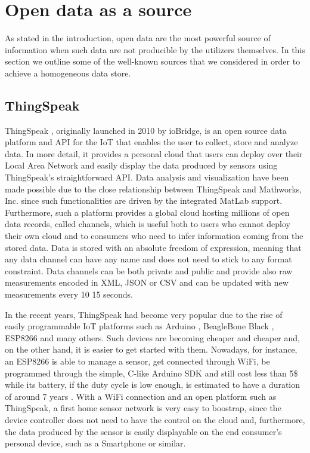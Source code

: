 \section{Open data as a source}
\label{sec:open}

As stated in the introduction, open data are the most powerful source of information when such data are not producible by the utilizers themselves.
In this section we outline some of the well-known sources that we considered in order to achieve a homogeneous data store.

\subsection{ThingSpeak}
ThingSpeak \cite{thingspeak}, originally launched in 2010 by ioBridge, is an open source data platform and API for the IoT that enables the user to collect, store and analyze data.
In more detail, it provides a personal cloud that users can deploy over their Local Area Network and easily display the data produced by sensors using ThingSpeak's straightforward API.
Data analysis and visualization have been made possible due to the close relationship between ThingSpeak and Mathworks, Inc. since such functionalities are driven by the integrated MatLab support. 
Furthermore, such a platform provides a global cloud hosting millions of open data records, called channels, which is useful both to users who cannot deploy their own cloud and to consumers who need to infer information coming from the stored data.
Data is stored with an absolute freedom of expression, meaning that any data channel can have any name and does not need to stick to any format constraint.
Data channels can be both private and public and provide also raw measurements encoded in XML, JSON or CSV and can be updated with new measurements every \color{red}10\color{black} 15 seconds.

In the recent years, ThingSpeak had become very popular due to the rise of easily programmable IoT platforms such as Arduino \cite{arduino}, BeagleBone Black \cite{bbblack}, ESP8266 \cite{esp8266} and many others.
Such devices are becoming cheaper and cheaper and, on the other hand, it is easier to get started with them.
Nowadays, for instance, an ESP8266 is able to manage a sensor, get connected through WiFi, be programmed through the simple, C-like Arduino SDK and still cost less than 5\$ while its battery, if the duty cycle is low enough, is estimated to have a duration of around 7 years \cite{di2015design}.
With a WiFi connection and an open platform such as ThingSpeak, a first home sensor network is very easy to boostrap, since the device controller does not need to have the control on the cloud and, furthermore, the data produced by the sensor is easily displayable on the end consumer's personal device, such as a Smartphone or similar.


